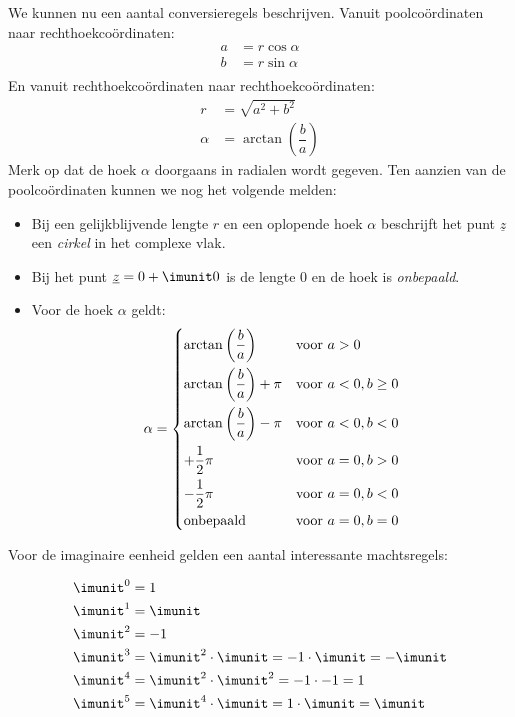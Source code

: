 We kunnen nu een aantal conversieregels beschrijven. Vanuit poolcoördinaten naar rechthoekcoördinaten:
%
\begin{equation}
\begin{split}
a &= r\cos\alpha \\
b &= r\sin\alpha \\
\end{split}
\end{equation}
En vanuit rechthoekcoördinaten naar rechthoekcoördinaten:
\begin{equation}
\begin{split}
r &= \sqrt{a^2 + b ^2} \\
\alpha &= \arctan\left(\dfrac{b}{a}\right)
\end{split}
\end{equation}
%
Merk op dat de hoek $\alpha$ doorgaans in radialen wordt gegeven.
Ten aanzien van de poolcoördinaten kunnen we nog het volgende melden:
\begin{itemize}
\item Bij een gelijkblijvende lengte $r$ en een oplopende hoek $\alpha$ beschrijft het punt $\underline{z}$ een \textsl{cirkel} in het complexe vlak.
\item Bij het punt $\underline{z} = 0 + \imunit0$ is de lengte 0 en de hoek is \textsl{onbepaald}.
\item Voor de hoek $\alpha$ geldt:
\begin{equation}
\alpha = \begin{dcases}
\arctan\left(\frac{b}{a}\right)       & \text{voor } a>0 \\
\arctan\left(\frac{b}{a}\right) + \pi & \text{voor } a<0, b \geq 0 \\
\arctan\left(\frac{b}{a}\right) - \pi & \text{voor } a<0, b < 0 \\
+\dfrac{1}{2}\pi                      & \text{voor } a=0, b > 0 \\
-\dfrac{1}{2}\pi                      & \text{voor } a=0, b < 0 \\
\text{onbepaald}                      & \text{voor } a=0, b = 0
\end{dcases}
\end{equation}
\end{itemize}


Voor de imaginaire eenheid gelden een aantal interessante machtsregels:

\begin{equation}
\begin{split}
\imunit^0 &= 1 \\
\imunit^1 &= \imunit \\
\imunit^2 &= -1 \\
\imunit^3 &= \imunit^2\cdot\imunit = -1\cdot\imunit = -\imunit\\
\imunit^4 &= \imunit^2\cdot\imunit^2 = -1\cdot-1 = 1 \\
\imunit^5 &= \imunit^4\cdot\imunit = 1\cdot\imunit = \imunit
\end{split}
\end{equation}

